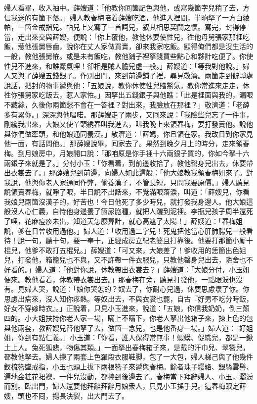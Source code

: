 婦人看畢，收入袖中。薛嫂道：「他教你囘箇記色與他，或寫幾箇字兒稍了去，方信我送的有箇下落。」婦人教春梅陪着薛嫂吃酒，他進入裡間，半晌拏了一方白綾帕，一箇金戒指兒。帕兒上又寫了一首詞兒，叙其相思契闊之懷。寫完，封得停當，走出來交與薛嫂，便說：「你上覆他，教他休要使性兒，徃他母舅張家那裡吃飯，惹他張舅唇齒，說你在丈人家做買賣，卻來我家吃飯。顯得俺們都是沒生活的一般，教他張舅恠。或是未有飯吃，教他鋪子裡拏錢買些點心和夥計吃便了。你使性兒不進來，和誰鱉氣哩！卻相是賊人膽兒虛一般。」薛嫂道：「等我對他說。」婦人又與了薛嫂五錢銀子。作別出門，來到前邊鋪子裡，尋見敬濟。兩箇走到僻靜處說話，把封的物事遞與他：「五娘說，教你休使性兒賭鱉氣，教你常進來走走，休徃你張舅家吃飯去，惹人家恠。」因拏出五錢銀子與他瞧：「此是裡面與我的，漏眼不藏絲，久後你兩箇愁不會在一答裡？對出來，我臉放在那裡？」敬濟道：「老薛多有累你。」深深與他唱喏。那薛嫂走了兩步，又囘來說：「我險些兒忘了一件事，剛纔我出來，大娘又使丫頭綉春叫我進去，叫我晚上來領春梅，要打發賣他。說他與你們做牽頭，和他娘通同養漢。」敬濟道：「薛媽，你且領在家。我改日到你家見他一面，有話問他。」那薛嫂說畢，囘家去了。果然到晚夕月上的時分，走來領春梅。到月娘房中，月娘開口說：「那咱原是你手裡十六兩銀子買的，你如今拏十六兩銀子來就是了。」分付小玉：「你看着，到前邊收拾了，教他罄身兒出去，休要帶出衣裳去了。」那薛嫂兒到前邊，向婦人如此這般：「他大娘教我領春梅姐來了。對我說，他與你老人家通同作弊，偷養漢子，不管長短，只問我要原價。」婦人聽見說領賣春梅，就睜了眼，半日說不出話來，不覺滿眼落淚，叫道：「薛嫂兒，你看我娘兒兩箇沒漢子的，好苦也！{}今日他死了多少時兒，就打發我身邊人。他大娘這般沒人心仁義，自恃他身邊養了箇尿胞種，就把人躧到泥裡。李瓶兒孩子周半還死了哩，花麻痘疹未出，知道天怎麼算計，就心高遮了太陽！」薛嫂道：「春梅姐說，爹在日曾收用過他。」婦人道：「收用過二字兒！死鬼把他當心肝肺腸兒一般看待！說一句，聽十句，要一奉十，正經成房立紀老婆且打靠後。他要打那箇小厮十棍兒，他爹不敢打五棍兒。」薛嫂道：「可又來，大娘差了！爹收用的恁箇出色姐兒，打發他，箱籠兒也不與，又不許帶一件衣服兒，只教他罄身兒出去，隣舍也不好看的。」{}婦人道：「他對你說，休教帶出衣裳去？」薛嫂道：「大娘分付，小玉姐便來。教他看着，休教帶衣裳出去。」那春梅在旁，聽見打發他，一點眼淚也沒有。見婦人哭，說道：「娘你哭怎的？奴去了，你耐心兒過，休要思慮壞了你。你思慮出病來，沒人知你疼熱。等奴出去，不與衣裳也罷，自古『好男不吃分時飯，好女不穿嫁時衣』。」{}正說着，只見小玉進來，說道：「五娘，你信我奶奶，倒三顛四的。小大姐扶持你老人家一場，瞞上不瞞下，你老人拏出他箱子來，揀上色的包與他兩套，教薛嫂兒替他拏了去，做箇一念兒，也是他番身一場。」婦人道：「好姐姐，你到有點仁義。」小玉道：「你看，誰人保得常無事！蝦蟆、促織兒，都是一鍬土上人。兔死狐悲，物傷其類。」一面拏出春梅箱子來，是戴的汗巾兒、翠簪兒，都教他拏去。婦人揀了兩套上色羅段衣服鞋脚，包了一大包，婦人梯己與了他幾件釵梳簪墜戒指，小玉也頭上拔下兩根簪子來遞與春梅。餘者珠子纓絡、銀絲雲髻、遍地金粧花裙襖，一件兒沒動，都擡到後邊去了。春梅當下拜辭婦人、小玉，灑淚而別。臨出門，婦人還要他拜辭拜辭月娘衆人，{}只見小玉搖手兒。這春梅跟定薛嫂，頭也不囘，揚長決裂，出大門去了。{}

